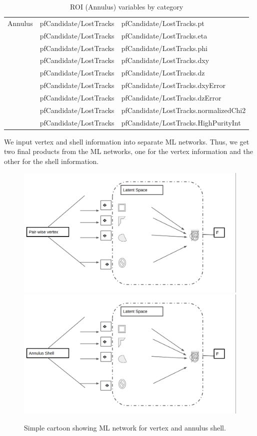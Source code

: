 \begin{table}[htb]
\caption{ROI (Annulus) variables by category}
\begin{center}
\begin{tabular}{r|l|l}\hline
 Annulus      & pfCandidate/LostTracks & pfCandidate/LostTracks.pt \\
              & pfCandidate/LostTracks & pfCandidate/LostTracks.eta \\
              & pfCandidate/LostTracks & pfCandidate/LostTracks.phi \\
              & pfCandidate/LostTracks & pfCandidate/LostTracks.dxy \\
              & pfCandidate/LostTracks & pfCandidate/LostTracks.dz \\
              & pfCandidate/LostTracks & pfCandidate/LostTracks.dxyError \\
              & pfCandidate/LostTracks & pfCandidate/LostTracks.dzError \\
              & pfCandidate/LostTracks & pfCandidate/LostTracks.normalizedChi2 \\
              & pfCandidate/LostTracks & pfCandidate/LostTracks.HighPurityInt \\
 \hline
 \hline
\end{tabular}
\label{tab:ROIANvars}
\end{center}
\end{table}

We input vertex and shell information into separate ML networks. Thus, we get two final products from the ML networks, one for the vertex information and the other for the shell information.

 \begin{figure}[h!]
   \caption{Simple cartoon showing ML network for vertex and annulus shell.}
   \label{fig:NetworkML}
   \centering
   \includegraphics[width=0.6\linewidth]{figs/PhiVNet.png}
   \includegraphics[width=0.6\linewidth]{figs/PhiANet.png}
 \end{figure}

